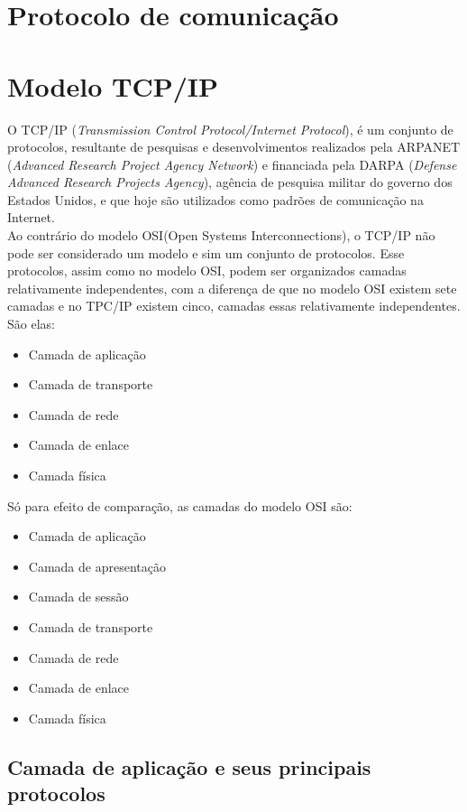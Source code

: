 \section{Protocolo de comunicação}

\section{Modelo TCP/IP}
O TCP/IP (\textit{Transmission Control Protocol/Internet Protocol}), é um conjunto de protocolos, resultante de pesquisas e desenvolvimentos realizados pela ARPANET (\textit{Advanced Research Project Agency Network}) e financiada pela DARPA (\textit{Defense Advanced Research Projects Agency}), agência de pesquisa militar do governo dos Estados Unidos, e que hoje são utilizados como padrões de comunicação na Internet.\\
Ao contrário do modelo OSI(Open Systems Interconnections), o TCP/IP não pode ser considerado um modelo e sim um conjunto de protocolos. Esse protocolos, assim como no modelo OSI, podem ser organizados camadas relativamente independentes, com a diferença de que no modelo OSI existem sete camadas e no TPC/IP existem cinco, camadas essas relativamente independentes. São elas:
\begin{itemize}
\item Camada de aplicação
\item Camada de transporte
\item Camada de rede
\item Camada de enlace
\item Camada física
\end{itemize}

Só para efeito de comparação, as camadas do modelo OSI são:
\begin{itemize}
\item Camada de aplicação
\item Camada de apresentação
\item Camada de sessão
\item Camada de transporte
\item Camada de rede
\item Camada de enlace
\item Camada física
\end{itemize}

\subsection{Camada de aplicação e seus principais protocolos}
